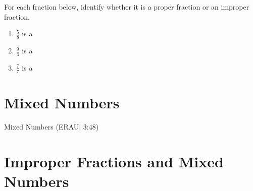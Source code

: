 \documentclass{ximera}
\begin{document}
For each fraction below, identify whether it is a proper fraction or an improper fraction.

\begin{problem}
\begin{enumerate}
    \item $\frac{5}{8}$ is a 
    \item $\frac{9}{4}$ is a 
    \item $\frac{7}{7}$ is a 
\end{enumerate}
\end{problem}


\section*{Mixed Numbers}

Mixed Numbers (ERAU| 3:48)



\section*{Improper Fractions and Mixed Numbers}
\end{document}
